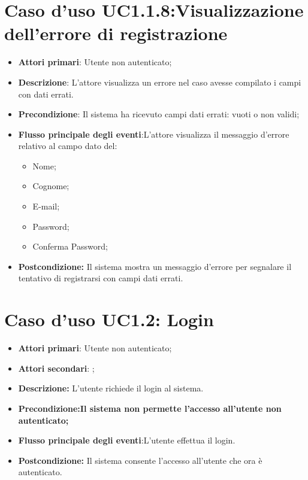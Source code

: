 \section{Caso d'uso UC1.1.8:Visualizzazione dell'errore di registrazione}
\begin{itemize}
	\item \textbf{Attori primari}: Utente non autenticato;
	\item \textbf{Descrizione}: L'attore visualizza un errore nel caso avesse compilato i campi con dati errati.
	\item \textbf{Precondizione}: Il sistema ha ricevuto campi dati errati: vuoti o non validi;
	\item \textbf{Flusso principale degli eventi}:L'attore visualizza il messaggio d'errore relativo al campo dato  del:
		\begin{itemize}
		\item Nome;
		\item Cognome;
		\item E-mail;
		\item Password;
		\item Conferma Password;
	\end{itemize}
	\item \textbf{Postcondizione:} Il sistema mostra un messaggio d'errore per segnalare il tentativo di registrarsi con campi dati errati.
\end{itemize}



\section{Caso d'uso UC1.2: Login}
\begin{itemize}
	\item \textbf{Attori primari}: Utente non autenticato;
	\item \textbf{Attori secondari}: ;
	\item \textbf{Descrizione:} L'utente richiede il login al sistema.
	\item \textbf{Precondizione:Il sistema non permette l'accesso all'utente non autenticato;}
	\item \textbf{Flusso principale degli eventi}:L'utente effettua il login.
	\item \textbf{Postcondizione:} Il sistema consente l'accesso all'utente che ora è autenticato.
\end{itemize}